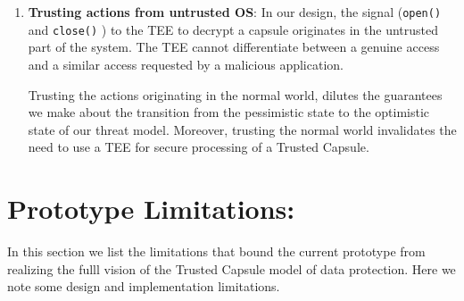 \begin{enumerate}
    \item{\bf Trusting actions from untrusted OS}: In our design, the signal
    ({\tt open()} and {\tt close()} ) to the TEE to decrypt a capsule originates
    in the untrusted part of the system. The TEE cannot differentiate between a
    genuine access and a similar access requested by a malicious application.
    
    Trusting the actions originating in the normal world, dilutes the guarantees
    we make about the transition from the pessimistic state to the optimistic
    state of our threat model. Moreover, trusting the normal world invalidates
    the need to use a TEE for secure processing of a Trusted Capsule.
\end{enumerate}

\section{Prototype Limitations:}
In this section we list the limitations that bound the current prototype from
realizing the fulll vision of the Trusted Capsule model of data protection. Here
we note some design and implementation limitations.

